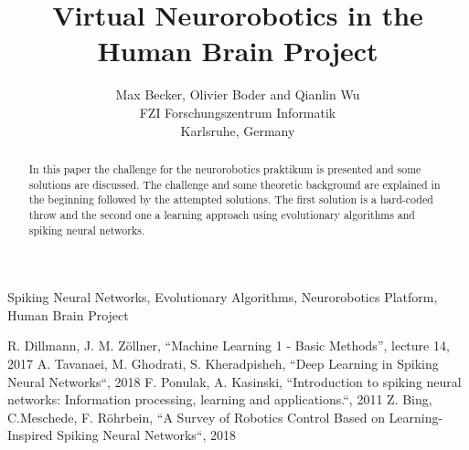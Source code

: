 \documentclass[conference]{IEEEtran}
\begin{document}
\title{Virtual Neurorobotics in the Human Brain Project}
\author{Max Becker, Olivier Boder and Qianlin Wu\\FZI Forschungszentrum Informatik\\Karlsruhe, Germany}

\maketitle
\thispagestyle{plain}
\pagestyle{plain}

\begin{abstract}
In this paper the challenge for the neurorobotics praktikum is presented and some solutions are discussed.
The challenge and some theoretic background are explained in the beginning followed by the attempted solutions.
The first solution is a hard-coded throw and the second one a learning approach using evolutionary algorithms and spiking neural networks.
\end{abstract}


\begin{IEEEkeywords}
Spiking Neural Networks, Evolutionary Algorithms, Neurorobotics Platform, Human Brain Project
\end{IEEEkeywords}












\begin{thebibliography}{00}
 R. Dillmann, J. M. Z{\"o}llner, ``Machine Learning 1 - Basic Methods'', lecture 14, 2017
 A. Tavanaei, M. Ghodrati, S. Kheradpisheh, ``Deep Learning in Spiking Neural Networks``, 2018
 F. Ponulak, A. Kasinski, ``Introduction to spiking neural networks: Information processing, learning and applications.``, 2011
 Z. Bing, C.Meschede, F. R{\"o}hrbein, ``A Survey of Robotics Control Based on Learning-Inspired Spiking Neural Networks``, 2018
\end{thebibliography}
\end{document}
